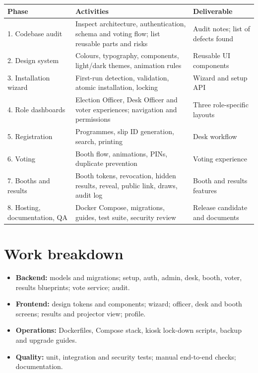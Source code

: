 \begin{center}
\small
\begin{tabularx}{\linewidth}{@{}>{\raggedright}p{3.1cm} X >{\raggedright\arraybackslash}p{3.6cm}@{}}
\toprule
\textbf{Phase} & \textbf{Activities} & \textbf{Deliverable} \\
\midrule
1. Codebase audit & Inspect architecture, authentication, schema and voting flow; list reusable parts and risks & Audit notes; list of defects found \\
2. Design system & Colours, typography, components, light/dark themes, animation rules & Reusable UI components \\
3. Installation wizard & First-run detection, validation, atomic installation, locking & Wizard and setup API \\
4. Role dashboards & Election Officer, Desk Officer and voter experiences; navigation and permissions & Three role-specific layouts \\
5. Registration & Programmes, slip ID generation, search, printing & Desk workflow \\
6. Voting & Booth flow, animations, PINs, duplicate prevention & Voting experience \\
7. Booths and results & Booth tokens, revocation, hidden results, reveal, public link, draws, audit log & Booth and results features \\
8. Hosting, documentation, QA & Docker Compose, migrations, guides, test suite, security review & Release candidate and documents \\
\bottomrule
\end{tabularx}
\end{center}

\section{Work breakdown}

\begin{itemize}
  \item \textbf{Backend:} models and migrations; setup, auth, admin, desk, booth, voter, results blueprints; vote service; audit.
  \item \textbf{Frontend:} design tokens and components; wizard; officer, desk and booth screens; results and projector view; profile.
  \item \textbf{Operations:} Dockerfiles, Compose stack, kiosk lock-down scripts, backup and upgrade guides.
  \item \textbf{Quality:} unit, integration and security tests; manual end-to-end checks; documentation.
\end{itemize}

